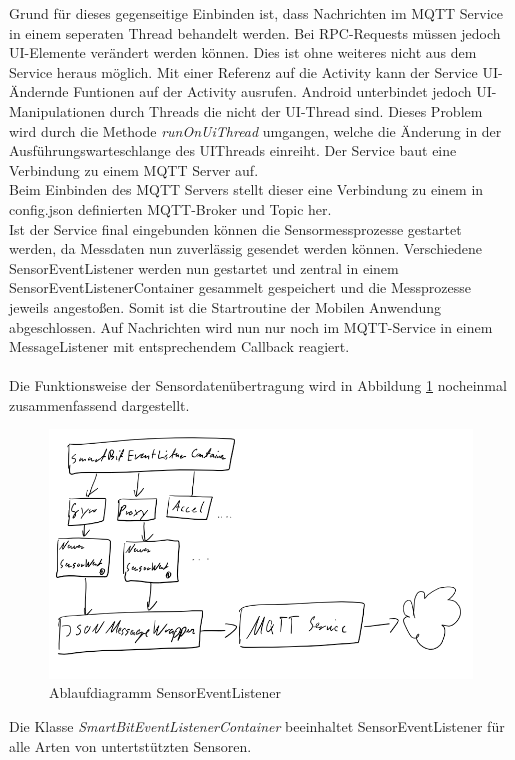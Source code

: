 \documentclass[11pt,a4paper]{report}
\begin{document}
Grund für dieses gegenseitige Einbinden ist, dass Nachrichten im MQTT Service in einem seperaten Thread behandelt werden.
Bei RPC-Requests müssen jedoch UI-Elemente verändert werden können.
Dies ist ohne weiteres nicht aus dem Service heraus möglich.
Mit einer Referenz auf die Activity kann der Service UI-Ändernde Funtionen auf der Activity ausrufen.
Android unterbindet jedoch UI-Manipulationen durch Threads die nicht der UI-Thread sind.
Dieses Problem wird durch die Methode \textit{runOnUiThread} umgangen, welche die Änderung in der Ausführungswarteschlange des UIThreads einreiht.
Der Service baut eine Verbindung zu einem MQTT Server auf.
\\
Beim Einbinden des MQTT Servers stellt dieser eine Verbindung zu einem in config.json definierten MQTT-Broker und Topic her.
\\
Ist der Service final eingebunden können die Sensormessprozesse gestartet werden, da Messdaten nun zuverlässig gesendet werden können.
Verschiedene SensorEventListener werden nun gestartet und zentral in einem SensorEventListenerContainer gesammelt gespeichert und die Messprozesse jeweils angestoßen.
Somit ist die Startroutine der Mobilen Anwendung abgeschlossen.
Auf Nachrichten wird nun nur noch im MQTT-Service in einem MessageListener mit entsprechendem Callback reagiert.
\\\\
Die Funktionsweise der Sensordatenübertragung wird in Abbildung \ref{fig:sensor_event_listener} nocheinmal zusammenfassend dargestellt.
\begin{figure}[htbp]
  \centering
  \includegraphics[width=.9\textwidth]{images/sensor_event_listener.png}
  \caption{Ablaufdiagramm SensorEventListener}
  \label{fig:sensor_event_listener}
\end{figure}
Die Klasse \textit{SmartBitEventListenerContainer} beeinhaltet SensorEventListener für alle Arten von untertstützten Sensoren.
\end{document}
